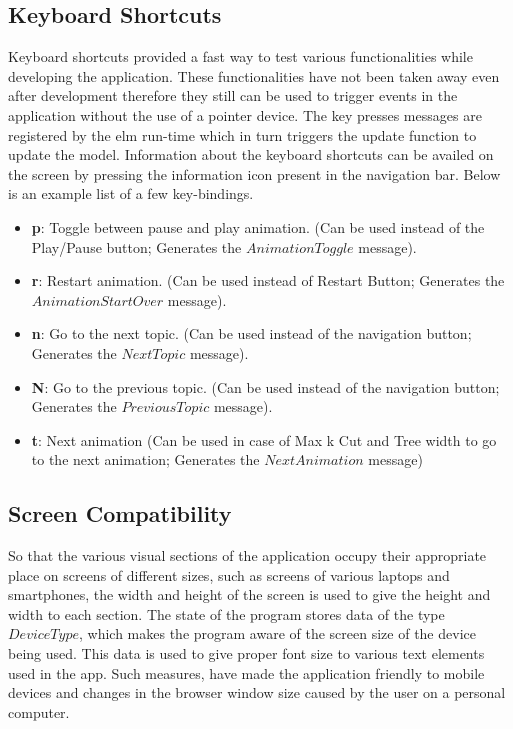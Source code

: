\subsection{Keyboard Shortcuts}
Keyboard shortcuts provided a fast way to test various functionalities while
developing the application.  These functionalities have not been taken away
even after development therefore they still can be used to trigger events in
the application without the use of a pointer device. 
The key presses messages are registered by the elm run-time which in turn
triggers the update function to update the model. Information about the keyboard shortcuts can be
availed on the screen by pressing the information icon present in the
navigation bar. Below is an example list of a few key-bindings.

\begin{itemize}
\item \textbf{p}: Toggle between pause and play animation. (Can be used instead of the Play/Pause button; Generates the $AnimationToggle$ message). \\
\item \textbf{r}: Restart animation. (Can be used instead of Restart Button; Generates the $AnimationStartOver$ message). \\
\item \textbf{n}: Go to the next topic. (Can be used instead of the navigation button; Generates the $NextTopic$ message). \\
\item \textbf{N}: Go to the previous topic. (Can be used instead of the navigation button; Generates the $PreviousTopic$ message). \\
\item \textbf{t}: Next animation (Can be used in case of Max k Cut and Tree width to go to the next animation; Generates the $NextAnimation$ message)
\end{itemize}


\subsection{Screen Compatibility}
So that the various visual sections of the application occupy their appropriate
place on screens of different sizes, such as screens of various laptops and
smartphones, the width and height of the screen is used to give the height and
width to each section.  
The state of the program stores data of the type $DeviceType$, which makes the
program aware of the screen size of the device being used. This data is used to
give proper font size to various text elements used in the app. Such measures,
have made the application friendly to mobile devices and changes in the browser
window size caused by the user on a personal computer.

